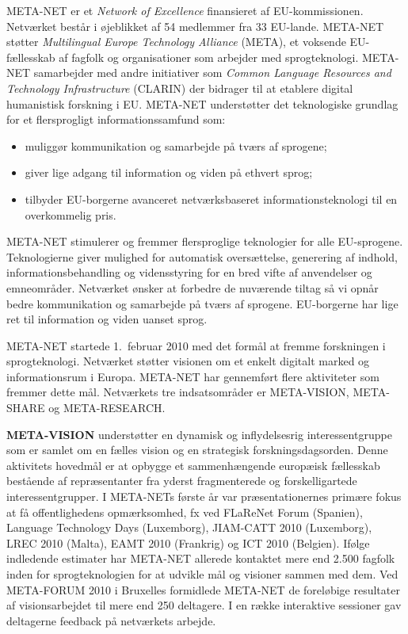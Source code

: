 \documentclass[]{../../metanetpaper}
\begin{document}
\begin{multicols}{2}

 META-NET er et {\it Network of Excellence} finansieret af EU-kommissionen. Netv\ae rket best\aa r i \o jeblikket af 54 medlemmer fra 33 EU-lande. META-NET st\o tter {\it Multilingual Europe Technology Alliance} (META), et voksende EU-f\ae llesskab af fagfolk og organisationer som arbejder med sprogteknologi. 
META-NET samarbejder med andre initiativer som {\it Common Language Resources and Technology Infrastructure} (CLARIN) der bidrager til at etablere digital humanistisk forskning i EU. META-NET underst\o tter det teknologiske grundlag for et flersprogligt informationssamfund som:
  \begin{itemize}
      \item muligg\o r kommunikation og samarbejde \mbox{p\aa} tv\ae rs af sprogene;
 \item giver lige adgang til information og viden \mbox{p\aa} ethvert sprog;
 \item	tilbyder EU-borgerne avanceret netv\ae rksbaseret informationsteknologi til en overkommelig pris.
\end{itemize}

META-NET stimulerer og fremmer flersproglige teknologier for alle EU-sprogene. Teknologierne giver mulighed for automatisk overs\ae ttelse, generering af indhold, informationsbehandling og vidensstyring for en bred vifte af anvendelser og emneomr\aa der. Netv\ae rket \o nsker at forbedre de nuv\ae rende tiltag \mbox{s\aa} vi opn\aa r bedre kommunikation og samarbejde \mbox{p\aa} tv\ae rs af sprogene. EU-borgerne har lige ret til information og viden uanset sprog. 

META-NET startede 1.\ februar 2010 med det form\aa l at fremme forskningen i sprogteknologi. Netv\ae rket st\o tter visionen om et enkelt digitalt marked og informationsrum i Europa. META-NET har gennemf\o rt flere aktiviteter som fremmer dette m\aa l. Netv\ae rkets tre indsatsomr\aa der er META-VISION, META-SHARE og META-RESEARCH.

 \textbf{META-VISION} underst\o tter en dynamisk og inflydelsesrig interessentgruppe som er samlet om en f\ae lles vision og en strategisk forskningsdagsorden. Denne aktivitets hovedm\aa l er at opbygge et sammenh\ae ngende europ\ae isk f\ae llesskab best\aa ende af repr\ae sentanter fra yderst fragmenterede og forskelligartede interessentgrupper. I META-NETs f\o rste \aa r var pr\ae sentationernes prim\ae re fokus at \mbox{f\aa} offentlighedens opm\ae rksomhed, fx ved FLaReNet Forum (Spanien), Language Technology Days (Luxemborg), JIAM-CATT 2010 (Luxemborg), LREC 2010 (Malta), EAMT 2010 (Frankrig) og ICT 2010 (Belgien). If\o lge indledende estimater har META-NET allerede kontaktet mere end 2.500 fagfolk inden for sprogteknologien for at udvikle m\aa l og visioner sammen med dem. Ved META-FORUM 2010 i Bruxelles formidlede META-NET de forel\o bige resultater af visionsarbejdet til mere end 250 deltagere. I en r\ae kke interaktive sessioner gav deltagerne feed\-back \mbox{p\aa} netv\ae rkets arbejde. 


\end{multicols}
\end{document}
